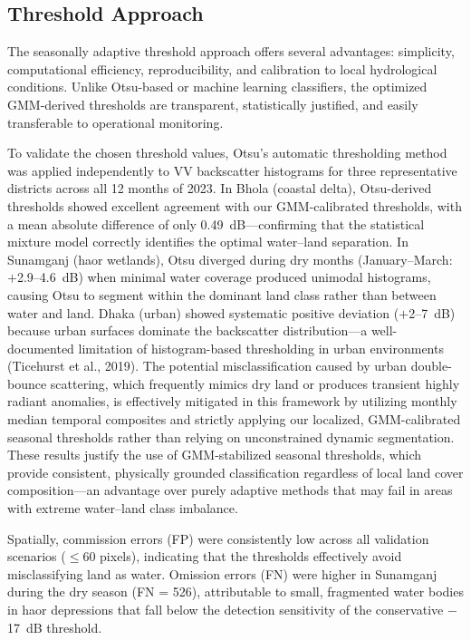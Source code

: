 \documentclass[fleqn,10pt,twocolumn]{article}
\begin{document}
\subsection{Threshold Approach}
The seasonally adaptive threshold approach offers several advantages: simplicity, computational efficiency, reproducibility, and calibration to local hydrological conditions. Unlike Otsu-based or machine learning classifiers, the optimized GMM-derived thresholds are transparent, statistically justified, and easily transferable to operational monitoring.

To validate the chosen threshold values, Otsu's automatic thresholding method was applied independently to VV backscatter histograms for three representative districts across all 12 months of 2023. In Bhola (coastal delta), Otsu-derived thresholds showed excellent agreement with our GMM-calibrated thresholds, with a mean absolute difference of only 0.49~dB---confirming that the statistical mixture model correctly identifies the optimal water--land separation. In Sunamganj (haor wetlands), Otsu diverged during dry months (January--March: $+$2.9--4.6~dB) when minimal water coverage produced unimodal histograms, causing Otsu to segment within the dominant land class rather than between water and land. Dhaka (urban) showed systematic positive deviation ($+$2--7~dB) because urban surfaces dominate the backscatter distribution---a well-documented limitation of histogram-based thresholding in urban environments (Ticehurst et al., 2019). The potential misclassification caused by urban double-bounce scattering, which frequently mimics dry land or produces transient highly radiant anomalies, is effectively mitigated in this framework by utilizing monthly median temporal composites and strictly applying our localized, GMM-calibrated seasonal thresholds rather than relying on unconstrained dynamic segmentation. These results justify the use of GMM-stabilized seasonal thresholds, which provide consistent, physically grounded classification regardless of local land cover composition---an advantage over purely adaptive methods that may fail in areas with extreme water--land class imbalance.

Spatially, commission errors (FP) were consistently low across all validation scenarios ($\leq$60 pixels), indicating that the thresholds effectively avoid misclassifying land as water. Omission errors (FN) were higher in Sunamganj during the dry season (FN = 526), attributable to small, fragmented water bodies in haor depressions that fall below the detection sensitivity of the conservative $-$17~dB threshold.
\end{document}
